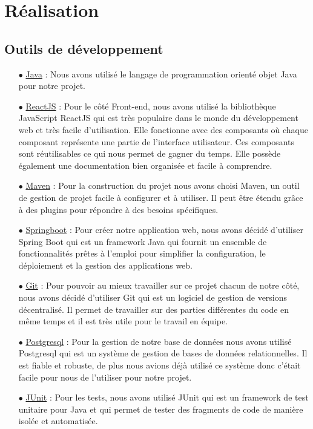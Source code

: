 \documentclass[a4paper]{report}
\begin{document}
\chapter{Réalisation}

\section{Outils de développement}

\begin{itemize}
    \item[$\bullet$] \underline{Java} : Nous avons utilisé le langage de programmation orienté objet Java pour notre projet. \cite{JavaSE17API} \newline
    \item[$\bullet$] \underline{ReactJS} : Pour le côté Front-end, nous avons utilisé la bibliothèque JavaScript ReactJS qui est très populaire dans le monde du développement web et 
    très facile d'utilisation. Elle fonctionne avec des composants où chaque composant représente une partie de l'interface utilisateur. Ces composants sont réutilisables ce qui nous permet de gagner du temps. 
    Elle possède également une documentation bien organisée et facile à comprendre. \cite{ReactJS} \newline
    \item[$\bullet$] \underline{Maven} : Pour la construction du projet nous avons choisi Maven, un outil de gestion de projet facile à configurer et à utiliser. Il peut être étendu grâce à des plugins pour répondre à des besoins spécifiques. \cite{ApacheMaven}\newline
    \item[$\bullet$] \underline{Springboot} : Pour créer notre application web, nous avons décidé d'utiliser Spring Boot qui est un framework Java qui fournit un ensemble de fonctionnalités prêtes à l'emploi pour simplifier la configuration, 
    le déploiement et la gestion des applications web. \cite{springboot} \newline 
    \item[$\bullet$] \underline{Git} : Pour pouvoir au mieux travailler sur ce projet chacun de notre côté, nous avons décidé d'utiliser Git qui est un logiciel de gestion de versions décentralisé. Il permet de travailler
    sur des parties différentes du code en même temps et il est très utile pour le travail en équipe. \cite{GitDocumentation}\newline
    \item[$\bullet$] \underline{Postgresql} : Pour la gestion de notre base de données nous avons utilisé Postgresql qui est un système de gestion de bases de données relationnelles. Il est fiable et robuste, de plus 
    nous avions déjà utilisé ce système donc c'était facile pour nous de l'utiliser pour notre projet. \cite{postgresql_doc} \newline
    \item[$\bullet$] \underline{JUnit} : Pour les tests, nous avons utilisé JUnit qui est un framework de test unitaire pour Java et qui permet de tester des fragments de code de manière isolée et automatisée. \cite{JUnit5}\newline
\end{itemize}
\end{document}

